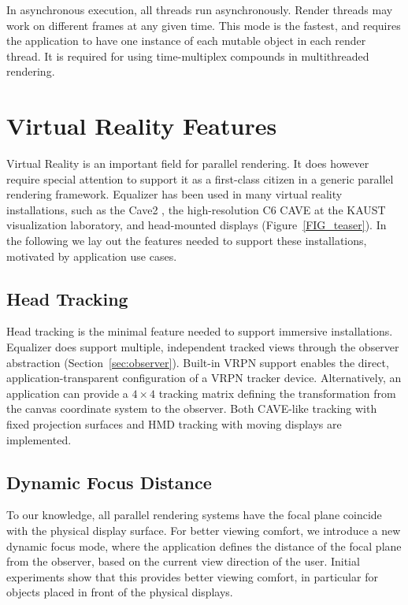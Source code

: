\documentclass[10pt,journal,compsoc]{IEEEtran}
\newcommand{\sref}[1]{Section~\ref{#1}}
\newcommand{\fig}[1]{Figure~\ref{#1}}
\begin{document}
In asynchronous execution, all threads run asynchronously. Render threads may
work on different frames at any given time. This mode is the fastest, and
requires the application to have one instance of each mutable object in each
render thread. It is required for using time-multiplex compounds in
multithreaded rendering.

\section{Virtual Reality Features}

Virtual Reality is an important field for parallel rendering. It does however
require special attention to support it as a first-class citizen in a generic
parallel rendering framework. \textsf{Equalizer} has been used in many virtual
reality installations, such as the Cave2 \cite{FNTTL:13}, the high-resolution C6
CAVE at the KAUST visualization laboratory, and head-mounted displays
(\fig{FIG_teaser}). In the following we lay out the features needed to support
these installations, motivated by application use cases.

\subsection{Head Tracking}

Head tracking is the minimal feature needed to support immersive installations.
\textsf{Equalizer} does support multiple, independent tracked views through the
observer abstraction (\sref{sec:observer}). Built-in VRPN support enables the
direct, application-transparent configuration of a VRPN tracker device.
Alternatively, an application can provide a $4\times 4$ tracking matrix defining
the transformation from the canvas coordinate system to the observer. Both
CAVE-like tracking with fixed projection surfaces and HMD tracking with moving
displays are implemented.

\subsection{Dynamic Focus Distance}

To our knowledge, all parallel rendering systems have the focal plane coincide
with the physical display surface. For better viewing comfort, we introduce a
new dynamic focus mode, where the application defines the distance of the focal
plane from the observer, based on the current view direction of the user.
Initial experiments show that this provides better viewing comfort, in
particular for objects placed in front of the physical displays.
\end{document}
